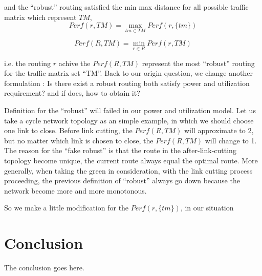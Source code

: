 \documentclass[conference]{IEEEtran}
\begin{document}
and the ``robust'' routing satisfied the min max distance for all possible traffic matrix which represent $TM$, 
\begin{equation}
Perf(r, TM) = \max_{tm\in TM} Perf(r, \{ tm \})
\end{equation}

\begin{equation}
Perf(R, TM) = \min_{r\in R} Perf(r, TM)
\end{equation}

i.e. the routing $r$ achive the $Perf(R,TM)$ represent the most ``robust'' routing for the traffic matrix set ``TM''. Back to our
origin question, we change another formulation : Is there exist a robust routing both satisfy power and utilization requirement?
and if does, how to obtain it?

Definition for the ``robust'' will failed in our power and utilization model. Let us take a cycle network topology as an simple example,
in which we should choose one link to close. Before link cutting, the $Perf(R, TM)$ will approximate to 2, but no matter which 
link is chosen to close, the $Perf(R, TM)$ will change to 1. The reason for the ``fake robust'' is that the route in the 
after-link-cutting topology become unique, the current route always equal the optimal route. More generally, when taking the green in
consideration, with the link cutting process proceeding, the previous definition of ``robust'' always go down because the network become
more and more monotonous.

So we make a little modification for the $Perf(r,\{ tm \})$, in our situation 

\section{Conclusion}
The conclusion goes here.


\end{document}
